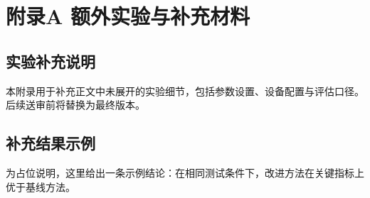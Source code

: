 \chapter{附录A 额外实验与补充材料}

\section{实验补充说明}
本附录用于补充正文中未展开的实验细节，包括参数设置、设备配置与评估口径。
后续送审前将替换为最终版本。

\section{补充结果示例}
为占位说明，这里给出一条示例结论：在相同测试条件下，改进方法在关键指标上优于基线方法。
